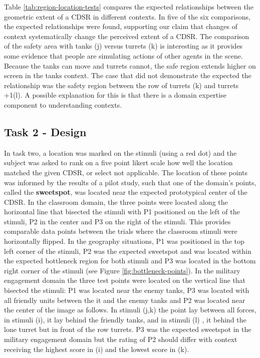 \documentclass[11pt,letterpaper]{article}
\begin{document}
Table \ref{tab:region-location-tests} compares the expected relationships between the geometric extent of a CDSR in different contexts.  In five of the six comparisons, the expected relationships were found, supporting our claim that changes of context systematically change the perceived extent of a CDSR.  The comparison of the safety area with tanks (j) versus turrets (k) is interesting as it provides some evidence that people are simulating actions of other agents in the scene.  Because the tanks can move and turrets cannot, the safe region extends higher on screen in the tanks context.  The case that did not demonstrate the expected the relationship was the safety region between the row of turrets (k) and turrets +1(l).   A possible explanation for this is that there is a domain expertise component to understanding contexts.


\subsection{Task 2 - Design} 
In task two, a location was marked on the stimuli (using a red dot) and the subject was asked to rank on a five point likert scale how well the location matched the given CDSR, or select not applicable.  The location of these points was informed by the results of a pilot study, such that one of the domain's points, called the \textbf{sweetspot}, was located near the expected prototypical center of the CDSR. In the classroom domain, the three points were located along the horizontal line that bisected the stimuli with P1 positioned on the left of the stimuli, P2 in the center and P3 on the right of the stimuli. This provides comparable data points between the trials where the classroom stimuli were horizontally flipped.  In the geography situations, P1 was positioned in the top left corner of the stimuli, P2 was the expected sweetspot and was located within the expected bottleneck region for both stimuli and P3 was located in the bottom right corner of the stimuli (see Figure \ref{fig:bottleneck-points}).  In the military engagement domain the three test points were located on the vertical line that bisected the stimuli: P1 was located near the enemy tanks, P3 was located with all friendly units between the it and the enemy tanks and P2 was located near the center of the image as follows. In stimuli (j,k) the point lay between all forces, in stimuli (i), it lay behind the friendly tanks, and in stimuli (l) , it behind the lone turret but in front of the row turrets.  P3 was the expected sweetspot in the military engagement domain but the rating of P2 should differ with context receiving the highest score in (i) and the lowest score in (k).
\end{document}
